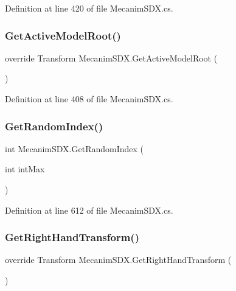 Definition at line 420 of file Mecanim\+S\+D\+X.\+cs.

\mbox{\label{class_mecanim_s_d_x_a51d0169cd3e746d50b416609ab89a677}} 
\subsubsection{\texorpdfstring{GetActiveModelRoot()}{GetActiveModelRoot()}}
{\footnotesize\ttfamily override Transform Mecanim\+S\+D\+X.\+Get\+Active\+Model\+Root (\begin{DoxyParamCaption}{ }\end{DoxyParamCaption})}



Definition at line 408 of file Mecanim\+S\+D\+X.\+cs.

\mbox{\label{class_mecanim_s_d_x_acea62037d362e9b31a79cde9d27424f0}} 
\subsubsection{\texorpdfstring{GetRandomIndex()}{GetRandomIndex()}}
{\footnotesize\ttfamily int Mecanim\+S\+D\+X.\+Get\+Random\+Index (\begin{DoxyParamCaption}\item[{int}]{int\+Max }\end{DoxyParamCaption})}



Definition at line 612 of file Mecanim\+S\+D\+X.\+cs.

\mbox{\label{class_mecanim_s_d_x_ae6cc2b4b1b64cc6623b24a4914e4a6f1}} 
\subsubsection{\texorpdfstring{GetRightHandTransform()}{GetRightHandTransform()}}
{\footnotesize\ttfamily override Transform Mecanim\+S\+D\+X.\+Get\+Right\+Hand\+Transform (\begin{DoxyParamCaption}{ }\end{DoxyParamCaption})}



